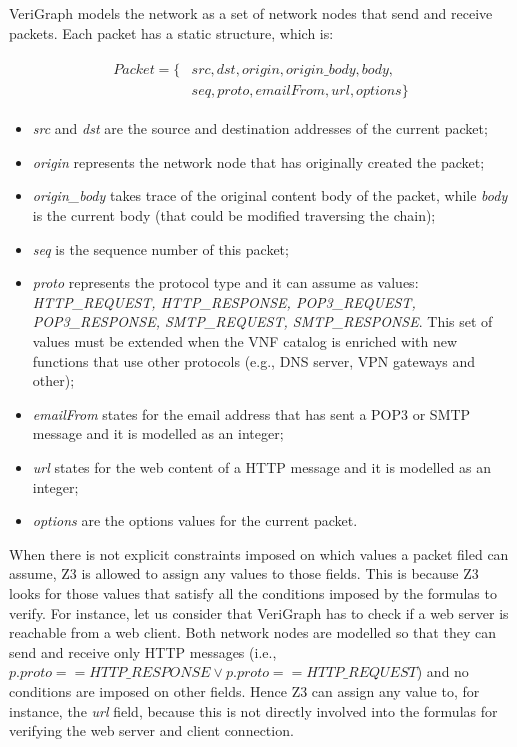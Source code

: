 VeriGraph models the network as a set of network nodes that send and receive packets. Each packet has a static structure, which is:
\begin{figure}[h]
	{\footnotesize
		\begin{subequations}
			\begin{align}
				\begin{split}
					Packet = \{& src, dst, origin, origin\_body, body,\\
					&   seq, proto, emailFrom, url, options\}
				\end{split}
			\end{align}
		\end{subequations}}
	\end{figure}
\begin{itemize}
	\item \textit{src} and \textit{dst} are the source and destination addresses of the current packet;
	\item \textit{origin} represents the network node that has originally created the packet;
	\item \textit{origin\_body} takes trace of the original content body of the packet, while \textit{body} is the current body (that could be modified traversing the chain);
	\item \textit{seq} is the sequence number of this packet;
	\item \textit{proto} represents the protocol type and it can assume as values: \textit{HTTP\_REQUEST, HTTP\_RESPONSE, POP3\_REQUEST, POP3\_RESPONSE, SMTP\_REQUEST, SMTP\_RESPONSE}. This set of values must be extended when the VNF catalog is enriched with new functions that use other protocols (e.g., DNS server, VPN gateways and other);
	\item \textit{emailFrom} states for the email address that has sent a POP3 or SMTP message and it is modelled as an integer;
	\item\textit{url} states for the web content of a HTTP message and it is modelled as an integer;
	\item \textit{options} are the options values for the current packet.
\end{itemize}
 When there is not explicit constraints imposed on which values a packet filed can assume, Z3 is allowed to assign any values to those fields. This is because Z3 looks for those values that satisfy all the conditions imposed by the formulas to verify. For instance, let us consider that VeriGraph has to check if a web server is reachable from a web client. Both network nodes are modelled so that they can send and receive only HTTP messages (i.e., \textit{$p.proto == HTTP\_RESPONSE \vee p.proto == HTTP\_REQUEST$}) and no conditions are imposed on other fields. Hence Z3 can assign any value to, for instance, the \textit{url} field, because this is not directly involved into the formulas for verifying the web server and client connection.

